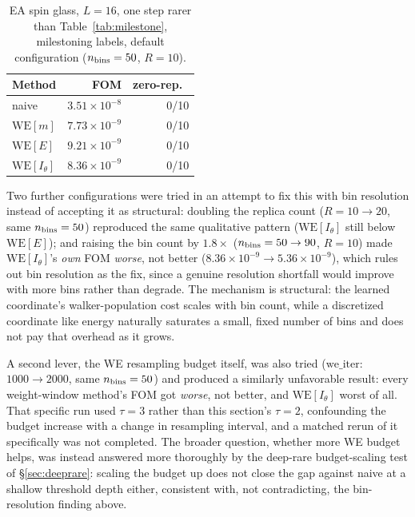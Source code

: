 \documentclass[11pt]{article}
\begin{document}
	\begin{table}[h]
		\centering\small
		\caption{EA spin glass, $L=16$, one step rarer than Table~\ref{tab:milestone}, milestoning
			labels, default configuration ($n_{\rm bins}=50$, $R=10$).}
		\label{tab:milestone2}
		\begin{tabular}{lrr}
			\toprule
			Method & FOM & zero-rep.\ \\
			\midrule
			naive & $3.51\times10^{-8}$ & 0/10 \\
			$\mathrm{WE}[m]$ & $7.73\times10^{-9}$ & 0/10 \\
			$\mathrm{WE}[E]$ & $9.21\times10^{-9}$ & 0/10 \\
			$\mathrm{WE}[I_\theta]$ & $8.36\times10^{-9}$ & 0/10 \\
			\bottomrule
		\end{tabular}
	\end{table}
	
	Two further configurations were tried in an attempt to fix this with bin resolution instead
	of accepting it as structural: doubling the replica count ($R=10\to20$, same $n_{\rm
		bins}=50$) reproduced the same qualitative pattern ($\mathrm{WE}[I_\theta]$ still below
	$\mathrm{WE}[E]$); and raising the bin count by $1.8\times$ ($n_{\rm bins}=50\to90$, $R=10$)
	made $\mathrm{WE}[I_\theta]$'s \emph{own} FOM \emph{worse}, not better
	($8.36\times10^{-9}\to5.36\times10^{-9}$), which rules out bin resolution as the fix, since
	a genuine resolution shortfall would improve with more bins rather than degrade. The
	mechanism is structural: the learned coordinate's walker-population cost scales with bin
	count, while a discretized coordinate like energy naturally saturates a small, fixed
	number of bins and does not pay that overhead as it grows.
	
	A second lever, the WE resampling budget itself, was also tried
	($\mathrm{we\_iter}$: $1000\to2000$, same $n_{\rm bins}=50$) and produced a similarly
	unfavorable result: every weight-window method's FOM got \emph{worse}, not better, and
	$\mathrm{WE}[I_\theta]$ worst of all. That specific run used $\tau=3$ rather than this
	section's $\tau=2$, confounding the budget increase with a change in resampling interval,
	and a matched rerun of it specifically was not completed. The broader question, whether
	more WE budget helps, was instead answered more thoroughly by the deep-rare
	budget-scaling test of \S\ref{sec:deeprare}: scaling the budget up does not close the gap
	against naive at a shallow threshold depth either, consistent with, not contradicting,
	the bin-resolution finding above.
	
\end{document}
